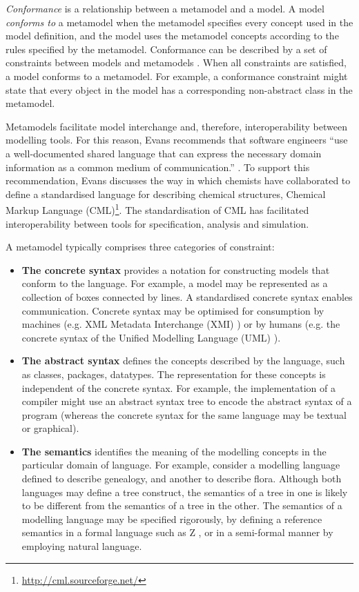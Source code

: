 \emph{Conformance} is a relationship between a metamodel and a model. A model \emph{conforms to} a metamodel when the metamodel specifies every concept used in the model definition, and the model uses the metamodel concepts according to the rules specified by the metamodel. Conformance can be described by a set of constraints between models and metamodels \cite{paige07metamodel}. When all constraints are satisfied, a model conforms to a metamodel. For example, a conformance constraint might state that every object in the model has a corresponding non-abstract class in the metamodel.

Metamodels facilitate model interchange and, therefore, interoperability between modelling tools.  For this reason, Evans recommends that software engineers ``use a well-documented shared language that can express the necessary domain information as a common medium of communication.'' \cite[pg377]{evans04domain}. To support this recommendation, Evans discusses the way in which chemists have collaborated to define a standardised language for describing chemical structures, Chemical Markup Language (CML)\footnote{\url{http://cml.sourceforge.net/}}. The standardisation of CML has facilitated interoperability between tools for specification, analysis and simulation.

A metamodel typically comprises three categories of constraint:

\begin{itemize}
	\item \textbf{The concrete syntax} provides a notation for constructing models that conform to the language. For example, a model may be represented as a collection of boxes connected by lines. A standardised concrete syntax enables communication. Concrete syntax may be optimised for consumption by machines (e.g. XML Metadata Interchange (XMI) \cite{xmi}) or by humans (e.g. the concrete syntax of the Unified Modelling Language (UML) \cite{uml212}).
	\item \textbf{The abstract syntax} defines the concepts described by the language, such as classes, packages, datatypes. The representation for these concepts is independent of the concrete syntax. For example, the implementation of a compiler might use an abstract syntax tree to encode the abstract syntax of a program (whereas the concrete syntax for the same language may be textual or graphical).
	\item \textbf{The semantics} identifies the meaning of the modelling concepts in the particular domain of language. For example, consider a modelling language defined to describe genealogy, and another to describe flora. Although both languages may define a tree construct, the semantics of a tree in one is likely to be different from the semantics of a tree in the other. The semantics of a modelling language may be specified rigorously, by defining a reference semantics in a formal language such as Z \cite{z}, or in a semi-formal manner by employing natural language.
\end{itemize}


